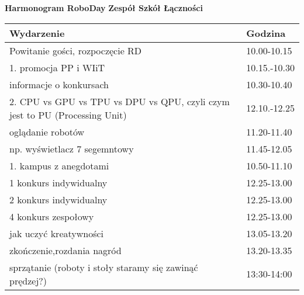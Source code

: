 \documentclass{article}
\begin{document}
\begin{center}
\Large\textbf{Harmonogram RoboDay}
\large\textbf{Zespół Szkół Łączności}
\end{center}
\vspace{1cm}
\begin{center}
\begin{tabular}{|l|l|}
\hline
\textbf{Wydarzenie} & \textbf{Godzina} \\
\hline
Powitanie gości, rozpoczęcie RD & 10.00-10.15 \\
\hline
1. promocja PP i WIiT & 10.15.-10.30 \\
\hline
informacje o konkursach & 10.30-10.40 \\
\hline
2. CPU vs GPU vs TPU vs DPU vs QPU, czyli czym jest to PU (Processing Unit) & 12.10.-12.25 \\
\hline
oglądanie robotów & 11.20-11.40 \\
\hline
np. wyświetlacz 7 segemntowy & 11.45-12.05 \\
\hline
1. kampus z anegdotami & 10.50-11.10 \\
\hline
1 konkurs indywidualny & 12.25-13.00 \\
\hline
2 konkurs indywidualny & 12.25-13.00 \\
\hline
4 konkurs zespołowy & 12.25-13.00 \\
\hline
jak uczyć kreatywności & 13.05-13.20 \\
\hline
zkończenie,rozdania nagród & 13.20-13.35 \\
\hline
sprzątanie (roboty i stoły staramy się zawinąć prędzej?) & 13:30-14:00 \\
\hline
\end{tabular}
\end{center}
\end{document}
